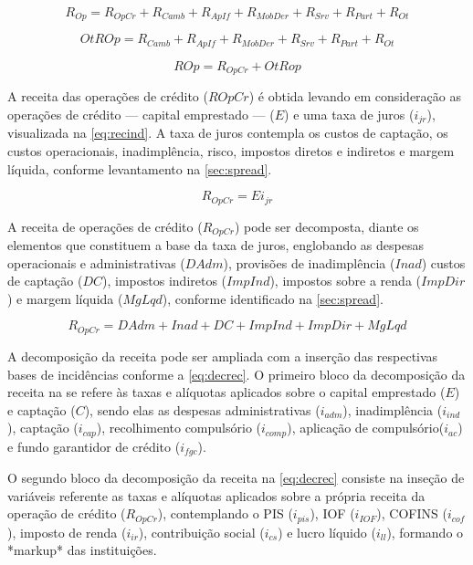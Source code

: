 \documentclass[
  12pt,
  12pt,
  openright,
  oneside,
  a4paper,
  chapter=TITLE,
  section=TITLE,
  subsection=TITLE,
  subsubsection=TITLE,
  english,
  portugues,
  sumario=tradicional]{abntex2}
\begin{document}
\begin{apendicesenv}
\begin{equation}\label{eq:receitas}
R_{Op} = R_{OpCr} + R_{Camb} + R_{ApIf} + R_{MobDer} + R_{Srv} + R_{Part} + R_{Ot}
\end{equation}




\begin{equation}
OtROp = R_{Camb} + R_{ApIf} + R_{MobDer} + R_{Srv} + R_{Part} + R_{Ot} 
\end{equation}



\begin{equation}
ROp = R_{OpCr} + OtRop
\end{equation}


A receita das operações de crédito ($ROpCr$) é obtida levando em  consideração as operações de crédito — capital emprestado — ($E$) e uma taxa de juros ($i_{jr}$), visualizada na \autoref{eq:recind}. A taxa de juros contempla os custos de captação, os custos operacionais, inadimplência, risco, impostos diretos e indiretos e margem líquida, conforme levantamento na \autoref{sec:spread}.


\begin{equation}\label{eq:recind}
R_{OpCr} = Ei_{jr}
\end{equation}


A receita de operações de crédito ($R_{OpCr}$) pode ser decomposta, diante os elementos que constituem a base da taxa de juros,  englobando as despesas operacionais e administrativas ($DAdm$), provisões de inadimplência ($Inad$) custos de captação ($DC$), impostos indiretos ($ImpInd$), impostos sobre a renda ($ImpDir$) e margem líquida ($MgLqd$), conforme identificado na \autoref{sec:spread}.


\begin{equation}
R_{OpCr} = DAdm + Inad + DC + ImpInd + ImpDir + MgLqd
\end{equation}


A decomposição da receita pode ser ampliada com a inserção das respectivas bases de incidências conforme a \autoref{eq:decrec}. O primeiro bloco da decomposição da receita na se refere às taxas e alíquotas aplicados sobre o capital emprestado ($E$) e captação ($C$), sendo elas as despesas administrativas ($i_{adm}$), inadimplência ($i_{ind}$), captação ($i_{cap}$), recolhimento compulsório ($i_{comp}$), aplicação de compulsório($i_{ac}$) e fundo garantidor de crédito ($i_{fgc}$).

O segundo bloco da decomposição da receita na \autoref{eq:decrec} consiste na inseção de variáveis referente as taxas e alíquotas aplicados sobre a própria receita da operação de crédito ($R_{OpCr}$), contemplando o PIS ($i_{pis}$), IOF ($i_{IOF}$), COFINS ($i_{cof}$), imposto de renda ($i_{ir}$), contribuição social ($i_{cs}$) e lucro líquido ($i_{ll}$), formando o *markup* das instituições.



\end{apendicesenv}
\end{document}
